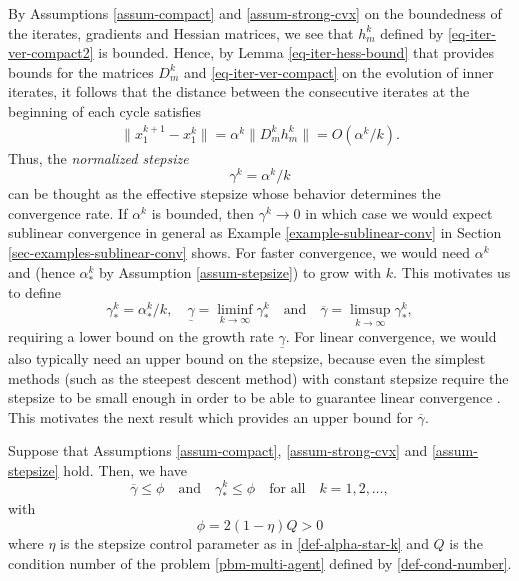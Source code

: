 \documentclass[final,numbook]{svjour3}
\begin{document}
By Assumptions \ref{assum-compact} and \ref{assum-strong-cvx} on the boundedness of the iterates, gradients and Hessian matrices, we see that $h_m^k$ defined by \eqref{eq-iter-ver-compact2} is bounded. Hence, by Lemma \ref{eq-iter-hess-bound} that provides bounds for the matrices $D_m^k$ and \eqref{eq-iter-ver-compact} on the evolution of inner iterates,
it follows that the distance between the consecutive iterates at the beginning of each cycle satisfies 
\begin{eqnarray*}
	\|x_{1}^{k+1} - x_1^k\| = \alpha^k \|D_m^k h_m^k\| = O(\alpha^k/k).
\end{eqnarray*} 
Thus, the \textit{normalized stepsize}
  \begin{equation}\label{eq-normalized-step}\gamma^k=\alpha^k/k
  \end{equation}
can be thought as the effective stepsize whose behavior determines the convergence rate. If $\alpha^k$ is bounded, then $\gamma^k \to 0$ in which case we would expect sublinear convergence in general as Example \ref{example-sublinear-conv} in Section \ref{sec-examples-sublinear-conv} shows. For faster convergence, we would need $\alpha^k$ and (hence $\alpha_*^k$ by Assumption \ref{assum-stepsize}) to grow with $k$. This motivates us to define
  \begin{equation}\label{def-limiting-stepsizes} \gamma_*^k=\alpha_*^k/k, \quad \underline{\gamma} = \liminf_{k\to \infty} \gamma_*^k \quad \mbox{and} \quad \overline{\gamma} = \limsup_{k\to \infty} \gamma_*^k, 
  \end{equation}
requiring a lower bound on the growth rate $\underline{\gamma}$. For linear convergence, we would also typically need an upper bound on the stepsize, because even the simplest methods (such as the steepest descent method) with constant stepsize require the stepsize to be small enough in order to be able to guarantee linear convergence \cite[Section 1.4.2]{Pol87}. This motivates the next result which provides an upper bound for $\overline{\gamma}$.
\begin{lemma}\label{lemm-alphastar-bound}
Suppose that Assumptions \ref{assum-compact}, \ref{assum-strong-cvx} and \ref{assum-stepsize} hold. Then, we have 
	\begin{equation}\label{ineq-gamma-star-k} \overline{\gamma} \leq \phi \quad \mbox{and} \quad \gamma_*^k \leq \phi \quad \mbox{for all} \quad k=1,2,\dots,
	\end{equation}
with \begin{equation}\label{def-phi}\phi = 2(1-\eta) Q > 0\end{equation} where $\eta$ is the stepsize control parameter as in \eqref{def-alpha-star-k} and $Q$ is the condition number of the problem \eqref{pbm-multi-agent} defined by \eqref{def-cond-number}.	
\end{lemma}
\end{document}
